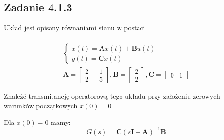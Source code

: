 \pagebreak
\subsection*{Zadanie 4.1.3} 
	Układ jest opisany równaniami stanu w postaci\\\\
\begin{gather*}
\begin{cases}
\dot{x}(t) = \mathbf{A}x(t) + \mathbf{B}u(t) \\
y(t) = \mathbf{C}x(t)
\end{cases}
\\
\mathbf{A} = \begin{bmatrix} 2 & -1 \\ 2 & -5 \end{bmatrix},
\mathbf{B} = \begin{bmatrix} 2 \\ 2 \end{bmatrix},
\mathbf{C} = \begin{bmatrix} 0 & 1 \end{bmatrix}
\end{gather*}

Znaleźć transmitancję operatorową tego układu przy założeniu zerowych warunków początkowych $x(0)=0$\\
\lineh	

Dla $x(0) = 0$ mamy:
\[ G(s) = \mathbf{C} (s\mathbf{I} - \mathbf{A})^{-1} \mathbf{B} \]

